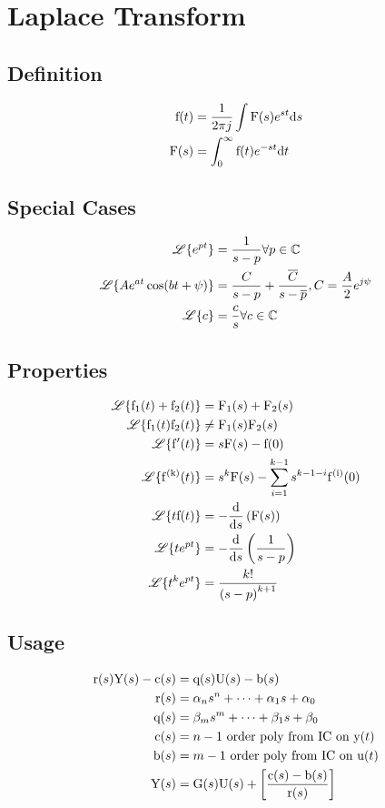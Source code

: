 \section*{Laplace Transform}
\subsection*{Definition}
\begin{align*}
    \func{f}[t] &= \frac{1}{2 \pi j} \intidef{\func{F}[s] e^{st}}[s] \\
    \func{F}[s] &= \intdef{0}{\infty}{\func{f}[t] e^{-st}}{t}
\end{align*}

\subsection*{Special Cases}
\begin{align*}
    \laplace{e^{pt}} &= \frac{1}{s-p} \forall p \in \mathbb{C} \\
    \laplace{Ae^{at}\cos{bt+\psi}} &= \frac{C}{s-p}+\frac{\overline{C}}{s-\overline{p}}, C = \frac{A}{2}e^{j\psi} \\
    \laplace{c} &= \frac{c}{s} \forall c \in \mathbb{C}
\end{align*}

\subsection*{Properties}
\begin{align*}
    \laplace{\func{f_1}[t] + \func{f_2}[t]} &= \func{F_1}[s]+\func{F_2}[s] \\
    \laplace{\func{f_1}[t]\func{f_2}[t]} &\neq \func{F_1}[s]\func{F_2}[s] \\
    \laplace{\func{f'}[t]} &= s \func{F}[s] - \func{f}[0] \\
    \laplace{\func{f^{(k)}}[t]} &= s^{k} \func{F}[s] - \sum_{i=1}^{k-1} s^{k-1-i}\func{f^{(i)}}[0] \\
    \laplace{t \func{f}[t]} &= -\deriv{s}{\func{F}[s]} \\
    \laplace{t e^{pt}} &= -\deriv{s}{\frac{1}{s-p}} \\
    \laplace{t^{k} e^{pt}} &= \frac{k!}{{(s-p)}^{k+1}}
\end{align*}

\subsection*{Usage}
\begin{align*}
    \func{r}[s]\func{Y}[s]-\func{c}[s] &= \func{q}[s]\func{U}[s]-\func{b}[s] \\
    \func{r}[s] &= \alpha_n s^n + \cdots + \alpha_1 s + \alpha_0 \\
    \func{q}[s] &= \beta_m s^m + \cdots + \beta_1 s + \beta_0 \\
    \func{c}[s] &= n-1 \text{ order poly from IC on } \func{y}[t] \\
    \func{b}[s] &= m-1 \text{ order poly from IC on } \func{u}[t] \\
    \func{Y}[s] &= \func{G}[s]\func{U}[s]+\left[\frac{\func{c}[s]-\func{b}[s]}{\func{r}[s]}\right]
\end{align*}